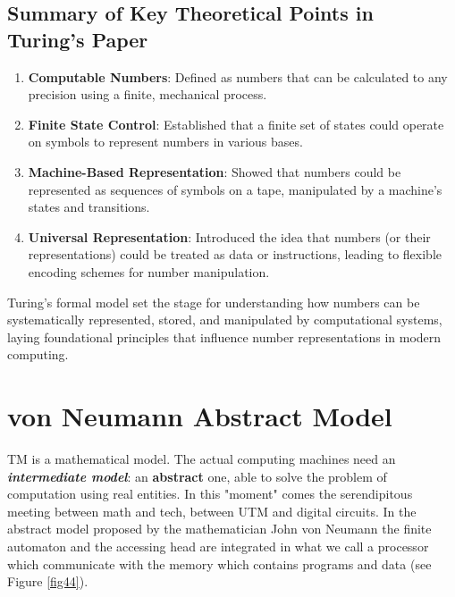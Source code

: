 \subsection{Summary of Key Theoretical Points in Turing's Paper}

\begin{enumerate}
    \item \textbf{Computable Numbers}: Defined as numbers that can be calculated to any precision using a finite, mechanical process.
    \item \textbf{Finite State Control}: Established that a finite set of states could operate on symbols to represent numbers in various bases.
    \item \textbf{Machine-Based Representation}: Showed that numbers could be represented as sequences of symbols on a tape, manipulated by a machine’s states and transitions.
    \item \textbf{Universal Representation}: Introduced the idea that numbers (or their representations) could be treated as data or instructions, leading to flexible encoding schemes for number manipulation.
\end{enumerate}

Turing’s formal model set the stage for understanding how numbers can be systematically represented, stored, and manipulated by computational systems, laying foundational principles that influence number representations in modern computing.

\section{von Neumann Abstract Model}

TM is a mathematical model. The actual computing machines need an {\bf {\em intermediate model}}: an {\bf abstract} one, able to solve the problem of computation using real entities. In this "moment" comes the  serendipitous  meeting between math and tech, between UTM and digital circuits. In the abstract model proposed by the mathematician John von Neumann the finite automaton and the accessing head are integrated in what we call a processor which communicate with the memory which contains  programs and data (see Figure \ref{fig44}). 


